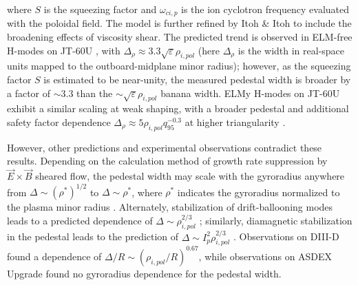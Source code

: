 \noindent where $S$ is the squeezing factor and $\omega_{ci,p}$ is the ion cyclotron frequency evaluated with the poloidal field.  The model is further refined by Itoh \& Itoh \cite{Itoh1996} to include the broadening effects of viscosity shear.  The predicted trend is observed in ELM-free H-modes on JT-60U \cite{Hatae1998}, with $\Delta_\rho \approx 3.3 \sqrt{\varepsilon} \rho_{i,pol}$ (here $\Delta_\rho$ is the width in real-space units mapped to the outboard-midplane minor radius); however, as the squeezing factor $S$ is estimated to be near-unity, the measured pedestal width is broader by a factor of $\sim 3.3$ than the $\sim \sqrt{\varepsilon} \rho_{i,pol}$ banana width.  ELMy H-modes on JT-60U exhibit a similar scaling at weak shaping, with a broader pedestal and additional safety factor dependence $\Delta_\rho \approx 5 \rho_{i,pol} q_{95}^{-0.3}$ at higher triangularity \cite{Kamada1999}.

However, other predictions and experimental observations contradict these results.  Depending on the calculation method of growth rate suppression by $\vec{E}\times\vec{B}$ sheared flow, the pedestal width may scale with the gyroradius anywhere from $\Delta \sim \left(\rho^*\right)^{1/2}$ to $\Delta \sim \rho^*$, where $\rho^*$ indicates the gyroradius normalized to the plasma minor radius \cite{Onjun2002,Beurskens2011}.  Alternately, stabilization of drift-ballooning modes leads to a predicted dependence of $\Delta \sim \rho_{i,pol}^{2/3}$ \cite{Wilson1997}; similarly, diamagnetic stabilization in the pedestal leads to the prediction of $\Delta \sim I_p^2 \rho_{i,pol}^{2/3}$ \cite{Rogers1999}.  Observations on DIII-D \cite{Osborne1998} found a dependence of $\Delta/R \sim (\rho_{i,pol}/R)^{0.67}$, while observations on ASDEX Upgrade \cite{Beurskens2011,Suttrop2000a} found no gyroradius dependence for the pedestal width.

